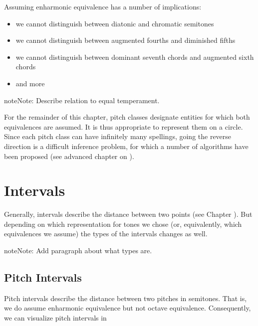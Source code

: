 \documentclass[letterpaper,10pt,english]{sphinxmanual}
\begin{document}
\sphinxAtStartPar
Assuming enharmonic equivalence has a number of implications:
\begin{itemize}
\item {} 
\sphinxAtStartPar
we cannot distinguish between diatonic and chromatic semitones

\item {} 
\sphinxAtStartPar
we cannot distinguish between augmented fourths and diminished fifths

\item {} 
\sphinxAtStartPar
we cannot distinguish between dominant seventh chords and augmented sixth chords

\item {} 
\sphinxAtStartPar
and more

\end{itemize}

\begin{sphinxadmonition}{note}{Note:}
\sphinxAtStartPar
Describe relation to equal temperament.
\end{sphinxadmonition}

\sphinxAtStartPar
For the remainder of this chapter, pitch classes designate entities for which both equivalences are assumed.
It is thus appropriate to represent them on a circle. Since each pitch class can have infinitely many spellings,
going the reverse direction is a difficult inference problem, for which a number of algorithms have been proposed
(see advanced chapter on {\hyperref[\detokenize{6_advanced:pitch-spelling}]{}}).


\section{Intervals}
\label{\detokenize{3_set_theory:intervals}}
\sphinxAtStartPar
Generally, intervals describe the distance between two points (see Chapter {\hyperref[\detokenize{1_fundamentals:intervals}]{}}).
But depending on which representation for tones we chose (or, equivalently, which equivalences we assume)
the types of the intervals changes as well.

\begin{sphinxadmonition}{note}{Note:}
\sphinxAtStartPar
Add paragraph about what types are.
\end{sphinxadmonition}


\subsection{Pitch Intervals}
\label{\detokenize{3_set_theory:pitch-intervals}}
\sphinxAtStartPar
Pitch intervals describe the distance between two pitches in semitones. That is, we do assume enharmonic equivalence
but not octave equivalence. Consequently, we can visualize pitch intervals in
\end{document}
